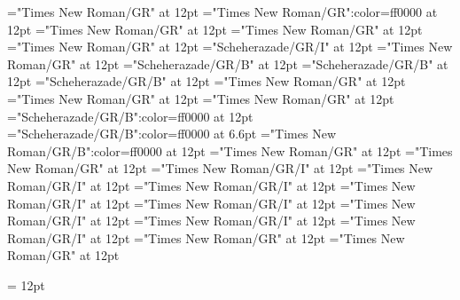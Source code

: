 \documentclass[a4paper]{article}
\begin{document}
\pagestyle{plain}
\sloppy
\setlength{\parfillskip}{0pt plus 1fil}
\font\spanen="Times New Roman/GR" at 12pt
\font\spanur="Times New Roman/GR":color=ff0000 at 12pt
\font\diven="Times New Roman/GR" at 12pt
\font\divur="Times New Roman/GR" at 12pt
\font\xitemxitemdefinitionbefore="Times New Roman/GR" at 12pt
\font\xitemxitemexamplebefore="Scheherazade/GR/I" at 12pt
\font\xitemxitemexamplesbefore="Times New Roman/GR" at 12pt
\font\xitemxitemheadwordbefore="Scheherazade/GR/B" at 12pt
\font\xitemxitemheadwordminorbefore="Scheherazade/GR/B" at 12pt
\font\xitemxitemLexEntrypublishRootMinorPrimaryTargetHeadWordRefbefore="Scheherazade/GR/B" at 12pt
\font\xitemxitemlexreftargetsbefore="Times New Roman/GR" at 12pt
\font{}="Times New Roman/GR" at 12pt
\font\entryletDatadicBody="Times New Roman/GR" at 12pt
\font\headwordurentryletDatadicBody="Scheherazade/GR/B":color=ff0000 at 12pt
\font\xhomographnumberheadwordurentryletDatadicBody="Scheherazade/GR/B":color=ff0000 at 6.6pt
\font\spanenheadwordurentryletDatadicBody="Times New Roman/GR/B":color=ff0000 at 12pt
\font\sensesentryletDatadicBody="Times New Roman/GR" at 12pt
\font\sensesensesentryletDatadicBody="Times New Roman/GR" at 12pt
\font\grammaticalinfosensesensesentryletDatadicBody="Times New Roman/GR/I" at 12pt
\font\partofspeechengrammaticalinfosensesensesentryletDatadicBody="Times New Roman/GR/I" at 12pt
\font\spanenpartofspeechengrammaticalinfosensesensesentryletDatadicBody="Times New Roman/GR/I" at 12pt
\font\slotsgrammaticalinfosensesensesentryletDatadicBody="Times New Roman/GR/I" at 12pt
\font\spanenslotsgrammaticalinfosensesensesentryletDatadicBody="Times New Roman/GR/I" at 12pt
\font\slotnameenslotsgrammaticalinfosensesensesentryletDatadicBody="Times New Roman/GR/I" at 12pt
\font\spanenslotnameenslotsgrammaticalinfosensesensesentryletDatadicBody="Times New Roman/GR/I" at 12pt
\font\spanengrammaticalinfosensesensesentryletDatadicBody="Times New Roman/GR/I" at 12pt
\font{}="Times New Roman/GR" at 12pt
\font\spanendefinitionensensesensesentryletDatadicBody="Times New Roman/GR" at 12pt

\mbox{} 
\newpage 
\newpage 
\setcounter{page}{1} 
\pagestyle{fancy} 
\setlength{\columnsep}{1.5em} 
\setlength\columnseprule{0.4pt} 
\begin{multicols}{2}{\raggedleft} \begin{spacing}{1.5}
\hangindent= 12pt
  \spanenslotsgrammaticalinfosensesensesentryletDatadicBody{: }  \end{spacing}
 \end{multicols}
\end{document}
